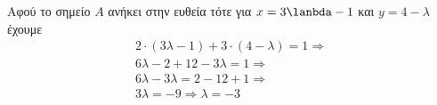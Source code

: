 Αφού το σημείο $ A $ ανήκει στην ευθεία τότε για $ x=3\lanbda-1 $ και $ y=4-\lambda $ έχουμε
\begin{gather*}
2\cdot(3\lambda-1)+3\cdot(4-\lambda)=1\Rightarrow\\
6\lambda-2+12-3\lambda=1\Rightarrow\\
6\lambda-3\lambda=2-12+1\Rightarrow\\
3\lambda=-9\Rightarrow \lambda =-3
\end{gather*}
